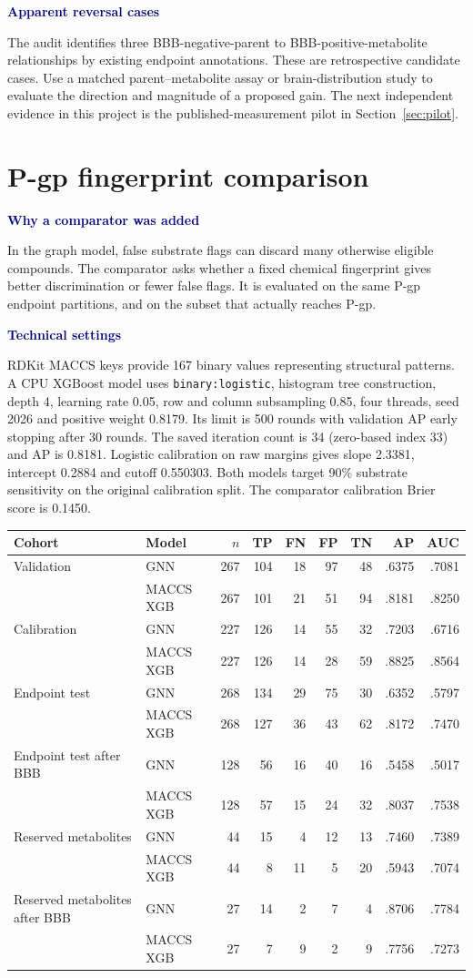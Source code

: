 \documentclass[11pt,a4paper]{article}
\newcommand{\code}[1]{\nolinkurl{#1}}
\newcommand{\lead}[1]{\par\smallskip\textbf{\textcolor{Navy}{#1}}\par\nobreak}
\newcommand{\pagehead}[1]{\clearpage\section{#1}}
\newcommand{\dense}{\small\renewcommand{\arraystretch}{1.11}\setlength{\tabcolsep}{4pt}}
\begin{document}
\lead{Apparent reversal cases}
The audit identifies three BBB-negative-parent to BBB-positive-metabolite relationships by existing endpoint annotations. These are retrospective candidate cases. Use a matched parent--metabolite assay or brain-distribution study to evaluate the direction and magnitude of a proposed gain. The next independent evidence in this project is the published-measurement pilot in Section~\ref{sec:pilot}.


\pagehead{P-gp fingerprint comparison}
\lead{Why a comparator was added}
In the graph model, false substrate flags can discard many otherwise eligible compounds. The comparator asks whether a fixed chemical fingerprint gives better discrimination or fewer false flags. It is evaluated on the same P-gp endpoint partitions, and on the subset that actually reaches P-gp.

\lead{Technical settings}
RDKit MACCS keys provide 167 binary values representing structural patterns. A CPU XGBoost model uses \code{binary:logistic}, histogram tree construction, depth 4, learning rate 0.05, row and column subsampling 0.85, four threads, seed 2026 and positive weight 0.8179. Its limit is 500 rounds with validation AP early stopping after 30 rounds. The saved iteration count is 34 (zero-based index 33) and AP is 0.8181. Logistic calibration on raw margins gives slope 2.3381, intercept 0.2884 and cutoff 0.550303. Both models target 90\% substrate sensitivity on the original calibration split. The comparator calibration Brier score is 0.1450.

{\dense
\begin{tabularx}{\linewidth}{YYrrrrrrr}
\toprule
Cohort & Model & $n$ & TP & FN & FP & TN & AP & AUC\\
\midrule
Validation & GNN & 267 & 104 & 18 & 97 & 48 & .6375 & .7081\\
& MACCS XGB & 267 & 101 & 21 & 51 & 94 & .8181 & .8250\\
Calibration & GNN & 227 & 126 & 14 & 55 & 32 & .7203 & .6716\\
& MACCS XGB & 227 & 126 & 14 & 28 & 59 & .8825 & .8564\\
Endpoint test & GNN & 268 & 134 & 29 & 75 & 30 & .6352 & .5797\\
& MACCS XGB & 268 & 127 & 36 & 43 & 62 & .8172 & .7470\\
Endpoint test after BBB & GNN & 128 & 56 & 16 & 40 & 16 & .5458 & .5017\\
& MACCS XGB & 128 & 57 & 15 & 24 & 32 & .8037 & .7538\\
Reserved metabolites & GNN & 44 & 15 & 4 & 12 & 13 & .7460 & .7389\\
& MACCS XGB & 44 & 8 & 11 & 5 & 20 & .5943 & .7074\\
Reserved metabolites after BBB & GNN & 27 & 14 & 2 & 7 & 4 & .8706 & .7784\\
& MACCS XGB & 27 & 7 & 9 & 2 & 9 & .7756 & .7273\\
\bottomrule
\end{tabularx}}
\end{document}
